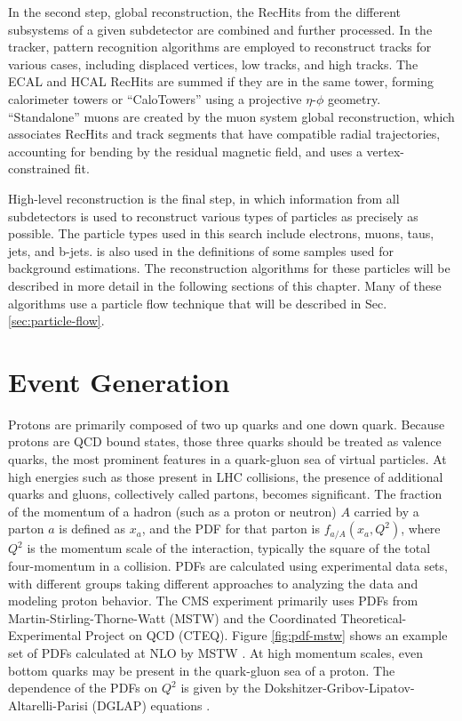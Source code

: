 In the second step, global reconstruction, the RecHits from the different subsystems of a given subdetector are combined and further processed. In the tracker, pattern recognition algorithms are employed to reconstruct tracks for various cases, including displaced vertices, low \pt tracks, and high \pt tracks. The ECAL and HCAL RecHits are summed if they are in the same tower, forming calorimeter towers or ``CaloTowers'' using a projective $\eta$-$\phi$ geometry. ``Standalone'' muons are created by the muon system global reconstruction, which associates RecHits and track segments that have compatible radial trajectories, accounting for bending by the residual magnetic field, and uses a vertex-constrained fit.

High-level reconstruction is the final step, in which information from all subdetectors is used to reconstruct various types of particles as precisely as possible. The particle types used in this search include electrons, muons, taus, jets, and b-jets. \met is also used in the definitions of some samples used for background estimations. The reconstruction algorithms for these particles will be described in more detail in the following sections of this chapter. Many of these algorithms use a particle flow technique that will be described in Sec. \ref{sec:particle-flow}.

\section{Event Generation}

Protons are primarily composed of two up quarks and one down quark. Because protons are QCD bound states, those three quarks should be treated as valence quarks, the most prominent features in a quark-gluon sea of virtual particles. At high energies such as those present in LHC collisions, the presence of additional quarks and gluons, collectively called partons, becomes significant. The fraction of the momentum of a hadron (such as a proton or neutron) $A$ carried by a parton $a$ is defined as $x_a$, and the PDF for that parton is $f_{a/A}(x_a,Q^2)$, where $Q^2$ is the momentum scale of the interaction, typically the square of the total four-momentum in a collision. PDFs are calculated using experimental data sets, with different groups taking different approaches to analyzing the data and modeling proton behavior. The CMS experiment primarily uses PDFs from Martin-Stirling-Thorne-Watt (MSTW) and the Coordinated Theoretical-Experimental Project on QCD (CTEQ). Figure \ref{fig:pdf-mstw} shows an example set of PDFs calculated at NLO by MSTW \cite{MSTW09}. At high momentum scales, even bottom quarks may be present in the quark-gluon sea of a proton. The dependence of the PDFs on $Q^2$ is given by the Dokshitzer-Gribov-Lipatov-Altarelli-Parisi (DGLAP) equations \cite{QuarkGluon}.

